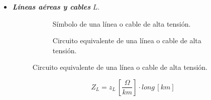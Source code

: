 \begin{itemize}
            \item \textbf{\textit{Líneas aéreas y cables}} $L$.
                \begin{figure}[H]
                    \begin{minipage}{0.5\textwidth}
                        \begin{figure}[H]
                            \centering
                            \caption{Símbolo de una línea o cable de alta tensión.}
                            \label{fig:lineaSimbolo}
                        \end{figure}
                    \end{minipage}%
                    \begin{minipage}{0.5\textwidth}
                        \begin{figure}[H]
                            \centering
                            \caption{Circuito equivalente de una línea o cable de alta tensión.}
                            \label{fig:lineaCto}
                        \end{figure}
                    \end{minipage}%
                \end{figure}

                \begin{equation}
                    Z_\textit{L} = z_\textit{L}\,\left[\dfrac{\varOmega}{\textit{km}}\right]\cdot long\,[\textit{km}]
                \end{equation}
            

\end{itemize}
